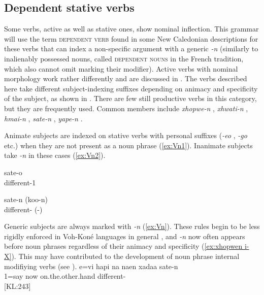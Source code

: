 \subsection{Dependent stative verbs}
\label{ssec:Verbs_n}
Some verbs, active as well as stative ones, show nominal inflection. This grammar will use the term \textsc{dependent verb} found in some New Caledonian descriptions \parencite[207]{ozanne-rivierre_iaai_1976} for these verbs that can index a non-specific argument with a generic \textit{-n} (similarly to inalienably possessed nouns, called \textsc{dependent nouns} in the French tradition, which also cannot omit marking their modifier). Active verbs with nominal morphology work rather differently and are discussed in . The verbs described here take different subject-indexing suffixes depending on animacy and specificity of the subject, as shown in . There are few still productive verbs in this category, but they are frequently used. Common members include \textit{xhopwe-n} , \textit{xhwati-n} , \textit{hmai-n} , \textit{sate-n} , \textit{yape-n} . %


Animate subjects are indexed on stative verbs with personal suffixes (\textit{-eo} , \textit{-go}  etc.) when they are not present as a noun phrase (\ref{ex:Vn1}). Inanimate subjects take \textit{-n}  in these cases (\ref{ex:Vn2}). %

\ea\label{ex:Vn1}
\gll sate-o\\
 different-1\\
\glt {}
\z


\ea\label{ex:Vn2}
\gll sate-n (koo-n)\\
 different- (-)\\
\glt {}
\z

Generic subjects are always marked with \textit{-n}  (\ref{ex:Vn}). These rules begin to be less rigidly enforced in Voh-Koné languages in general \parencite[51]{rivierre_bwatoo_2006}, and \textit{-n} now often appears before noun phrases regardless of their animacy and specificity (\ref{ex:xhopwen i-X}). This may have contributed to the development of noun phrase internal modifiying verbs (see ).
\ea\label{ex:Vn}\gll e=vi hapi na naen xadaa sate-n \\
 1=say   now on.the.other.hand different-\\
\glt {} {[KL:243]}
\z

